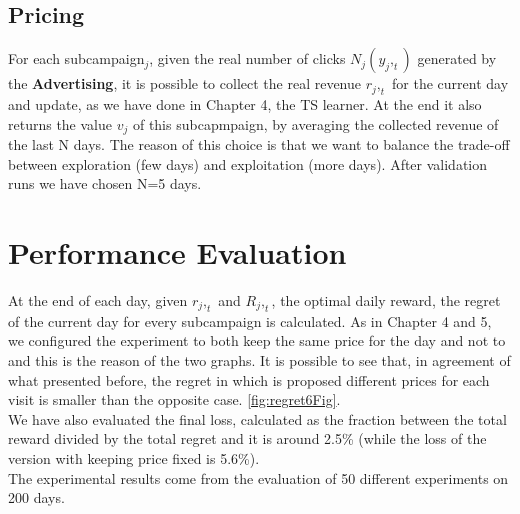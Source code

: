     \subsection{Pricing}
    For each subcampaign$_j$, given the real number of clicks $ N_j(y_j,_t) $ generated by the \textbf{Advertising}, it is possible to collect the real revenue $ r_j,_t $ for the current day and update, as we have done in Chapter 4, the TS learner. At the end it also returns the value $ v_j $ of this subcapmpaign, by averaging the collected revenue of the last N days. The reason of this choice is that we want to balance the trade-off between exploration (few days) and exploitation (more days). After validation runs we have chosen N=5 days.

\section{Performance Evaluation}
At the end of each day, given $ r_j,_t $ and $ R_j,_t $, the optimal daily reward, the regret of the current day for every subcampaign is calculated. As in Chapter 4 and 5, we configured the experiment to both keep the same price for the day and not to and this is the reason of the two graphs. It is possible to see that, in agreement of what presented before, the regret in which is proposed different prices for each visit is smaller than the opposite case. \ref{fig:regret6Fig}.\\ 
We have also evaluated the final loss, calculated as the fraction between the total reward divided by the total regret and it is around 2.5\% (while the loss of the version with keeping price fixed is 5.6\%). \\
The experimental results come from the evaluation of 50 different experiments on 200 days.

